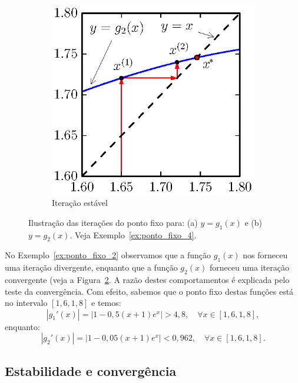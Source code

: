 \begin{figure}[h]
\begin{subfigure}[b]{0.45\textwidth}
        \includegraphics{./cap_equacao1d/pics/ponto_fixo_estavel/ponto_fixo_estavel.eps}
        \caption{Iteração estável}
        \label{fig:ponto_fixo_estavel.}
    \end{subfigure}
    \caption{Ilustração das iterações do ponto fixo para: (a) $y = g_1(x)$ e (b) $y = g_2(x)$. Veja Exemplo~\ref{ex:ponto_fixo_4}.} \label{fig:teste_de_convergencia}
\end{figure}

\begin{ex}\label{ex:ponto_fixo_4}
  No Exemplo~\ref{ex:ponto_fixo_2} observamos que a função $g_1(x)$ nos forneceu uma iteração divergente, enquanto que a função $g_2(x)$ forneceu uma iteração convergente (veja a Figura~\ref{fig:teste_de_convergencia}. A razão destes comportamentos é explicada pelo teste da convergência. Com efeito, sabemos que o ponto fixo destas funções está no intervalo $[1,6, 1,8]$ e temos:
  \begin{equation*}
    |g_1'(x)| = |1 - 0,5(x+1)e^x| > 4,8,\quad\forall x\in [1,6, 1,8],
  \end{equation*}
enquanto:
\begin{equation*}
  |g_2'(x)| = |1 - 0,05(x+1)e^x| < 0,962,\quad\forall x\in [1,6, 1,8].
\end{equation*}
\end{ex}

\subsection{Estabilidade e convergência}

